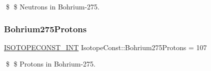 \$ \$ Neutrons in Bohrium-\/275. \mbox{\label{group___isotope_const-_bohrium-_bh275_gabe0aaf59b2f648704bb1bed6a395b5b4}} 
\subsubsection{\texorpdfstring{Bohrium275\+Protons}{Bohrium275Protons}}
{\footnotesize\ttfamily \mbox{\hyperlink{group___isotope_const-_macros_ga5f18360b3e99483a35c32d789e62621c}{I\+S\+O\+T\+O\+P\+E\+C\+O\+N\+S\+T\+\_\+\+I\+NT}} Isotope\+Const\+::\+Bohrium275\+Protons = 107}

\$ \$ Protons in Bohrium-\/275. 